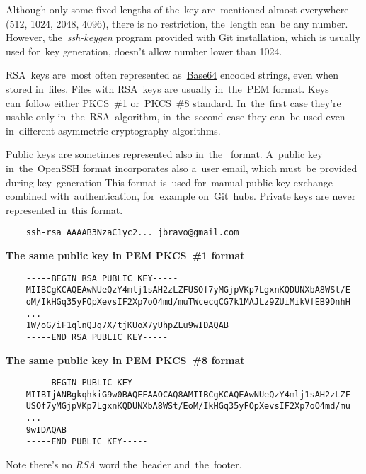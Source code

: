 \warning Although only some fixed lengths of the~key are~mentioned almost everywhere (512, 1024, 2048, 4096), there is no restriction, the~length can~be any number.
However, the~\textit{ssh-keygen} program provided with Git installation, which is usually used for~key generation, doesn't allow number lower than 1024.

RSA~keys are~most often represented as~\hyperref[base64]{\mbox{Base64}} encoded strings, even when stored in~files.
Files with RSA~keys are usually in~the~\hyperref[pem]{PEM} format.
Keys can~follow either \hyperref[pkcs]{PKCS~\#1} or~\hyperref[pkcs]{PKCS~\#8} standard.
In~the~first case they're usable only in~the~RSA~algorithm, in~the~second case they can~be used even in~different asymmetric cryptography algorithms.

Public keys are sometimes represented also in~the~ format.
A~public key in~the~OpenSSH format incorporates also a~user email, which must~be provided during key~generation
This format is~used for~manual public key exchange combined with~\hyperref[authenticationauthorization]{authentication}, for~example on~Git~hubs.
Private keys are never represented in~this format.

\begin{lstlisting}
    ssh-rsa AAAAB3NzaC1yc2... jbravo@gmail.com
\end{lstlisting}
\newline

\noindent \textbf{The same public key in PEM PKCS~\#1 format}
\begin{lstlisting}
    -----BEGIN RSA PUBLIC KEY-----
    MIIBCgKCAQEAwNUeQzY4mlj1sAH2zLZFUSOf7yMGjpVKp7LgxnKQDUNXbA8WSt/E
    oM/IkHGq35yFOpXevsIF2Xp7oO4md/muTWcecqCG7k1MAJLz9ZUiMikVfEB9DnhH
    ...
    1W/oG/iF1qlnQJq7X/tjKUoX7yUhpZLu9wIDAQAB
    -----END RSA PUBLIC KEY-----
\end{lstlisting}
\newline

\noindent \textbf{The same public key in PEM PKCS~\#8 format}
\begin{lstlisting}
    -----BEGIN PUBLIC KEY-----
    MIIBIjANBgkqhkiG9w0BAQEFAAOCAQ8AMIIBCgKCAQEAwNUeQzY4mlj1sAH2zLZF
    USOf7yMGjpVKp7LgxnKQDUNXbA8WSt/EoM/IkHGq35yFOpXevsIF2Xp7oO4md/mu
    ...
    9wIDAQAB
    -----END PUBLIC KEY-----
\end{lstlisting}
\noindent Note there's no \textit{RSA} word the~header and~the~footer.
